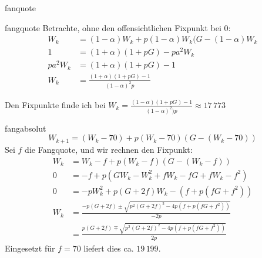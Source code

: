 \documentclass[%
<<<<<<< Updated upstream
<<<<<<< Updated upstream
11pt,%
twoside,%
titlepage,%
german,%
headsepline%
]{scrartcl}
\begin{document}
\begin{uebenv}{fanquote}
\begin{lsg}{fangquote}
    Betrachte, ohne den offensichtlichen Fixpunkt bei $0$:
    \begin{align*}
        W_{k} &= (1-\alpha)W_k+p(1-\alpha)W_k(G-(1-\alpha)W_k\\
        1 &= (1+\alpha)(1+pG)-pa^2W_k\\
        pa^2W_k &= (1+\alpha)(1+pG)-1\\
        W_k &= \frac{(1+\alpha)(1+pG)-1}{(1-\alpha)^2p}
    \end{align*}
    
    Den Fixpunkte finde ich bei $W_k=\frac{(1-\alpha)(1+pG)-1}{(1-\alpha)^2)p}\approx17\,773$
\end{lsg}

\begin{lsg}{fangabsolut}
    $$W_{k+1}=(W_k-70)+p(W_k-70)(G-(W_k-70))$$
 Sei $f$ die Fangquote, und wir rechnen den Fixpunkt:
    \begin{align*}
        W_{k} &= W_k-f+p(W_k-f)(G-(W_k-f))\\
        0 &= -f+p(GW_k-W_k^2+fW_k-fG+fW_k-f^2)\\
        0 &= -pW_k^2+p(G+2f)W_k-(f+p(fG+f^2))\\
        W_k &= \frac{-p(G+2f)\pm\sqrt{p^2(G+2f)^2-4p(f+p(fG+f^2))}}{-2p}\\
        &= \frac{p(G+2f)\mp\sqrt{p^2(G+2f)^2-4p(f+p(fG+f^2))}}{2p}
    \end{align*}
    Eingesetzt für $f=70$ liefert dies ca. $19\,199$.
\end{lsg}

\clearpage


\end{uebenv}
\end{document}
